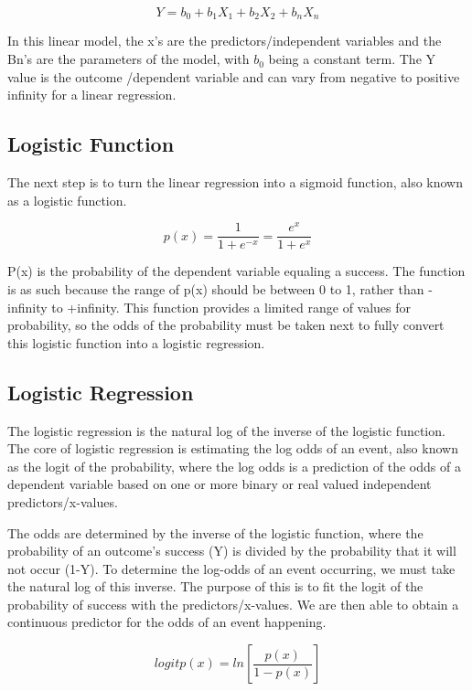 \documentclass[letterpaper, 10 pt, conference]{ieeeconf}  %
\begin{document}
$$Y = b_0 + b_1X_1 + b_2X_2 + b_nX_n$$

In this linear model, the x’s are the predictors/independent variables and the Bn’s are the parameters of the model, with $b_0$ being a constant term. The Y value is the outcome /dependent variable and can vary from negative to positive infinity for a linear regression. %

\subsection{Logistic Function}
The next step is to turn the linear regression into a sigmoid function, also known as a logistic function. 

$$p(x) =  \frac{1}{1+e^{-x}}   =   \frac{e^x}{1+e^x}$$

P(x) is the probability of the dependent variable equaling a success. The function is as such because the range of p(x) should be between 0 to 1, rather than -infinity to +infinity. This function provides a limited range of values for probability, so the odds of the probability must be taken next to fully convert this logistic function into a logistic regression. %

\subsection{Logistic Regression} 
The logistic regression is the natural log of the inverse of the logistic function. The core of logistic regression is estimating the log odds of an event, also known as the logit of the probability, where the log odds is a prediction of the odds of a dependent variable based on one or more binary or real valued independent predictors/x-values.

The odds are determined by the inverse of the logistic function, where the probability of an outcome’s success (Y) is divided by the probability that it will not occur (1-Y). To determine the log-odds of an event occurring, we must take the natural log of this inverse. The purpose of this is to fit the logit of the probability of success with the predictors/x-values. We are then able to obtain a continuous predictor for the odds of an event happening.

$$logit p(x) = ln[\frac{p(x)}{1-p(x)}]$$
\end{document}
